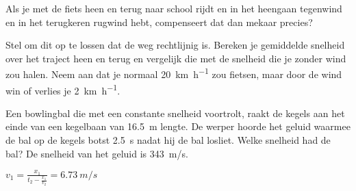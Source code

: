 \documentclass{ximera}
\begin{document}
\begin{exercise}
    Als je met de fiets heen en terug naar school rijdt en in het heengaan tegenwind en in het terugkeren rugwind hebt, compenseert dat dan mekaar precies?

    Stel om dit op te lossen dat de weg rechtlijnig is. Bereken je gemiddelde snelheid over het traject heen en terug en vergelijk die met de snelheid die je zonder wind zou halen. Neem aan dat je normaal \SI{20}{\kilo\meter\per\hour} zou fietsen, maar door de wind win of verlies je \SI{2}{\kilo\meter\per\hour}.
    \begin{multipleChoice}
    \end{multipleChoice}
\end{exercise}

\begin{exercise}
    Een bowlingbal die met een constante snelheid voortrolt, raakt de kegels aan het einde van een kegelbaan van \SI{16,5}{m} lengte. De werper hoorde het geluid waarmee de bal op de kegels botst \SI{2,5}{s} nadat hij de bal losliet. Welke snelheid had de bal? De snelheid van het geluid is \SI{343}{m/s}. 
    \begin{oplossing}
        $v_1=\frac{x_1}{t_2-\frac{x_1}{v_2}}=\SI{6,73}{m/s}$
    \end{oplossing}
\end{exercise}
\end{document}
